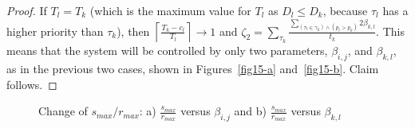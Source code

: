 \documentclass{sig-alternate}
\begin{document}
\begin{proof}
If $T_{l}=T_{k}$ (which is
the maximum value for $T_{l}$ as $D_{l}\le D_{k}$, because
$\tau_{l}$ has a higher priority than $\tau_{k}$), then $\left\lceil\frac{T_{k}-c_{l}}{T_{l}}\right\rceil\rightarrow1$
and $\zeta_2=\sum_{\tau_{k}}\frac{\sum_{\left(\tau_{l}\in\gamma_{k}\right)\wedge\left(p_{l}>p_{k}\right)}2\beta_{k,l}}{t_{k}}$. 
This means that the system will be controlled by only two parameters, $\beta_{i,j}$, and $\beta_{k,l}$, as in the previous two cases, shown in Figures~\ref{fig15-a} and~\ref{fig15-b}. Claim follows.
\end{proof}

\begin{figure}
\begin{centering}
\par\end{centering}
\centering{}\caption{\label{fig15}Change of $s_{max}/r_{max}$: a) $\frac{s_{max}}{r_{max}}$
versus $\beta_{i,j}$ and b) $\frac{s_{max}}{r_{max}}$ versus $\beta_{k,l}$}
\end{figure}
\end{document}
